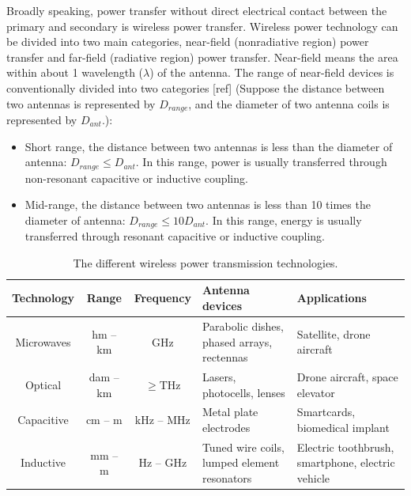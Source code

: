 Broadly speaking, power transfer without direct electrical contact between the primary and secondary is wireless power transfer. Wireless power technology can be divided into two main categories, near-field (nonradiative region) power transfer and far-field (radiative region) power transfer. 
Near-field means the area within about 1 wavelength ($\lambda$) of the antenna. The range of near-field devices is conventionally divided into two categories [ref] (Suppose the distance between two antennas is represented by $D_{range}$, and the diameter of two antenna coils is represented by $D_{ant}$.):
\begin{itemize}
    \item  Short range, the distance between two antennas is less than the diameter of antenna: $D_{range} \leq D_{ant}$. In this range, power is usually transferred through non-resonant capacitive or inductive coupling.
    \item Mid-range, the distance between two antennas is less than 10 times the diameter of antenna:  $D_{range} \leq 10 D_{ant}$. In this range, energy is usually transferred through resonant capacitive or inductive coupling.
\end{itemize} 

\begin{table}[!b]
    \centering
    \caption{The different wireless power transmission technologies.}
    \begin{tabular}{ |c|c|c|m{3.5cm}<{\centering}|m{3.5cm}<{\centering}| }
        \hline
        \textbf{Technology} & \textbf{Range} & \textbf{Frequency}         & \textbf{Antenna devices}                    & \textbf{Applications}                             \\\hline
Microwaves          & hm – km        & GHz                        & Parabolic dishes, phased arrays, rectennas  & Satellite, drone aircraft                         \\ \hline
Optical             & dam – km
                    & $\geq$THz      & Lasers, photocells, lenses & Drone aircraft, space elevator                                                                  \\ \hline
Capacitive          & cm – m         & kHz – MHz                  & Metal plate electrodes                      & Smartcards, biomedical implant
\\ \hline
Inductive           & mm – m         & Hz – GHz                   & Tuned wire coils, lumped element resonators & Electric toothbrush, smartphone, electric vehicle
\\ \hline
    \end{tabular}
    \label{table:differentWPT}
\end{table}

